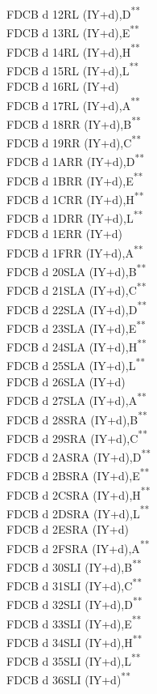 \documentclass[12pt,twoside,openright,a4paper]{book}
\newcommand{\UNDOC}{\textnormal{\textsuperscript{**}}}
\begin{document}
\begin{multicols}{3}
{\begin{tabbing}
	FDCB d 12\>RL (IY+d),D\UNDOC\\
	FDCB d 13\>RL (IY+d),E\UNDOC\\
	FDCB d 14\>RL (IY+d),H\UNDOC\\
	FDCB d 15\>RL (IY+d),L\UNDOC\\
	FDCB d 16\>RL (IY+d)\\
	FDCB d 17\>RL (IY+d),A\UNDOC\\
	FDCB d 18\>RR (IY+d),B\UNDOC\\
	FDCB d 19\>RR (IY+d),C\UNDOC\\
	FDCB d 1A\>RR (IY+d),D\UNDOC\\
	FDCB d 1B\>RR (IY+d),E\UNDOC\\
	FDCB d 1C\>RR (IY+d),H\UNDOC\\
	FDCB d 1D\>RR (IY+d),L\UNDOC\\
	FDCB d 1E\>RR (IY+d)\\
	FDCB d 1F\>RR (IY+d),A\UNDOC\\
	FDCB d 20\>SLA (IY+d),B\UNDOC\\
	FDCB d 21\>SLA (IY+d),C\UNDOC\\
	FDCB d 22\>SLA (IY+d),D\UNDOC\\
	FDCB d 23\>SLA (IY+d),E\UNDOC\\
	FDCB d 24\>SLA (IY+d),H\UNDOC\\
	FDCB d 25\>SLA (IY+d),L\UNDOC\\
	FDCB d 26\>SLA (IY+d)\\
	FDCB d 27\>SLA (IY+d),A\UNDOC\\
	FDCB d 28\>SRA (IY+d),B\UNDOC\\
	FDCB d 29\>SRA (IY+d),C\UNDOC\\
	FDCB d 2A\>SRA (IY+d),D\UNDOC\\
	FDCB d 2B\>SRA (IY+d),E\UNDOC\\
	FDCB d 2C\>SRA (IY+d),H\UNDOC\\
	FDCB d 2D\>SRA (IY+d),L\UNDOC\\
	FDCB d 2E\>SRA (IY+d)\\
	FDCB d 2F\>SRA (IY+d),A\UNDOC\\
	FDCB d 30\>SLI (IY+d),B\UNDOC\\
	FDCB d 31\>SLI (IY+d),C\UNDOC\\
	FDCB d 32\>SLI (IY+d),D\UNDOC\\
	FDCB d 33\>SLI (IY+d),E\UNDOC\\
	FDCB d 34\>SLI (IY+d),H\UNDOC\\
	FDCB d 35\>SLI (IY+d),L\UNDOC\\
	FDCB d 36\>SLI (IY+d)\UNDOC\\

\end{tabbing}}
\end{multicols}
\end{document}
